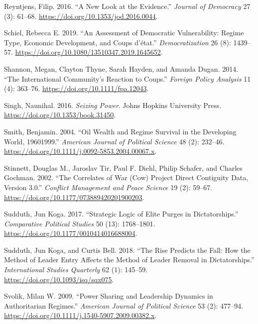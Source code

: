 \documentclass[
  12pt,
]{report}
\newlength{\cslhangindent}
\newenvironment{CSLReferences}[2] %
 {\begin{list}{}{%
  \setlength{\itemindent}{0pt}
  \setlength{\leftmargin}{0pt}
  \setlength{\parsep}{0pt}
  \ifodd #1
   \setlength{\leftmargin}{\cslhangindent}
   \setlength{\itemindent}{-1\cslhangindent}
  \fi
  \setlength{\itemsep}{#2\baselineskip}}}
 {\end{list}}
\begin{document}
\begin{CSLReferences}{1}{0}
Reyntjens, Filip. 2016. {``A New Look at the Evidence.''} \emph{Journal
of Democracy} 27 (3): 61--68.
\url{https://doi.org/10.1353/jod.2016.0044}.

Schiel, Rebecca E. 2019. {``An Assessment of Democratic Vulnerability:
Regime Type, Economic Development, and Coups d{'}état.''}
\emph{Democratization} 26 (8): 1439--57.
\url{https://doi.org/10.1080/13510347.2019.1645652}.

Shannon, Megan, Clayton Thyne, Sarah Hayden, and Amanda Dugan. 2014.
{``The International Community's Reaction to Coups.''} \emph{Foreign
Policy Analysis} 11 (4): 363--76.
\url{https://doi.org/10.1111/fpa.12043}.

Singh, Naunihal. 2016. \emph{Seizing Power}. Johns Hopkins University
Press. \url{https://doi.org/10.1353/book.31450}.

Smith, Benjamin. 2004. {``Oil Wealth and Regime Survival in the
Developing World, 1960{\textendash}1999.''} \emph{American Journal of
Political Science} 48 (2): 232--46.
\url{https://doi.org/10.1111/j.0092-5853.2004.00067.x}.

Stinnett, Douglas M., Jaroslav Tir, Paul F. Diehl, Philip Schafer, and
Charles Gochman. 2002. {``The Correlates of War (Cow) Project Direct
Contiguity Data, Version 3.0.''} \emph{Conflict Management and Peace
Science} 19 (2): 59--67.
\url{https://doi.org/10.1177/073889420201900203}.

Sudduth, Jun Koga. 2017. {``Strategic Logic of Elite Purges in
Dictatorships.''} \emph{Comparative Political Studies} 50 (13):
1768--1801. \url{https://doi.org/10.1177/0010414016688004}.

Sudduth, Jun Koga, and Curtis Bell. 2018. {``The Rise Predicts the Fall:
How the Method of Leader Entry Affects the Method of Leader Removal in
Dictatorships.''} \emph{International Studies Quarterly} 62 (1):
145--59. \url{https://doi.org/10.1093/isq/sqx075}.

Svolik, Milan W. 2009. {``Power Sharing and Leadership Dynamics in
Authoritarian Regimes.''} \emph{American Journal of Political Science}
53 (2): 477--94. \url{https://doi.org/10.1111/j.1540-5907.2009.00382.x}.


\end{CSLReferences}
\end{document}
